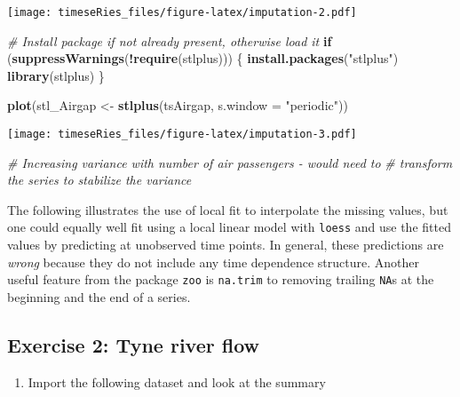\documentclass[]{book}
\newenvironment{Shaded}{\begin{snugshade}}{\end{snugshade}}
\newcommand{\CommentTok}[1]{\textcolor[rgb]{0.56,0.35,0.01}{\textit{#1}}}
\newcommand{\ControlFlowTok}[1]{\textcolor[rgb]{0.13,0.29,0.53}{\textbf{#1}}}
\newcommand{\DataTypeTok}[1]{\textcolor[rgb]{0.13,0.29,0.53}{#1}}
\newcommand{\KeywordTok}[1]{\textcolor[rgb]{0.13,0.29,0.53}{\textbf{#1}}}
\newcommand{\NormalTok}[1]{#1}
\newcommand{\OperatorTok}[1]{\textcolor[rgb]{0.81,0.36,0.00}{\textbf{#1}}}
\newcommand{\StringTok}[1]{\textcolor[rgb]{0.31,0.60,0.02}{#1}}
\providecommand{\tightlist}{%
  \setlength{\itemsep}{0pt}\setlength{\parskip}{0pt}}
\begin{document}
\texttt{[image: timeseRies\_files/figure-latex/imputation-2.pdf]}

\begin{Shaded}
\begin{Highlighting}[]
\CommentTok{# Install package if not already present, otherwise load it}
\ControlFlowTok{if}\NormalTok{ (}\KeywordTok{suppressWarnings}\NormalTok{(}\OperatorTok{!}\KeywordTok{require}\NormalTok{(stlplus))) \{}
    \KeywordTok{install.packages}\NormalTok{(}\StringTok{"stlplus"}\NormalTok{)}
    \KeywordTok{library}\NormalTok{(stlplus)}
\NormalTok{\}}

\KeywordTok{plot}\NormalTok{(stl_Airgap <-}\StringTok{ }\KeywordTok{stlplus}\NormalTok{(tsAirgap, }\DataTypeTok{s.window =} \StringTok{"periodic"}\NormalTok{))}
\end{Highlighting}
\end{Shaded}

\texttt{[image: timeseRies\_files/figure-latex/imputation-3.pdf]}

\begin{Shaded}
\begin{Highlighting}[]
\CommentTok{# Increasing variance with number of air passengers - would need to}
\CommentTok{# transform the series to stabilize the variance}
\end{Highlighting}
\end{Shaded}

The following illustrates the use of local fit to interpolate the
missing values, but one could equally well fit using a local linear
model with \texttt{loess} and use the fitted values by predicting at
unobserved time points. In general, these predictions are \emph{wrong}
because they do not include any time dependence structure. Another
useful feature from the package \texttt{zoo} is \texttt{na.trim} to
removing trailing \texttt{NA}s at the beginning and the end of a series.

\hypertarget{exercise-2-tyne-river-flow}{%
\subsection{Exercise 2: Tyne river
flow}\label{exercise-2-tyne-river-flow}}

\begin{enumerate}
\def\labelenumi{\arabic{enumi}.}
\tightlist
\item
  Import the following dataset and look at the summary
\end{enumerate}
\end{document}
